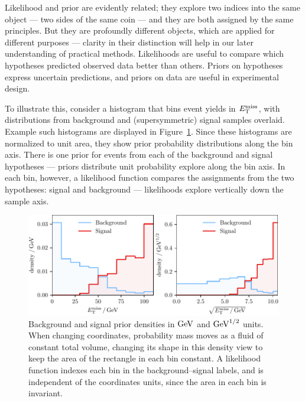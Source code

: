 Likelihood and prior are evidently related; they explore two indices into
the same object --- two sides of the same coin --- and they are both assigned
by the same principles.
But they are profoundly different objects, which are applied for different
purposes ---
clarity in their distinction will help in our later understanding of
practical methods.
Likelihoods are useful to compare which hypotheses predicted observed data
better than others.
Priors on hypotheses express uncertain predictions, and
priors on data are useful in experimental design.

To illustrate this, consider a histogram that bins event yields in
$\met$, with distributions from background and (supersymmetric) signal samples
overlaid.
Example such histograms are displayed in
Figure~\ref{fig:searches_sig_bkg_prior_likelihood}.
Since these histograms are normalized to unit area, they show prior
probability distributions along the bin axis.
There is one prior for events from each of the background and signal
hypotheses ---
priors distribute unit probability explore along the bin axis.
In each bin, however, a likelihood function compares the assignments from
the two hypotheses: signal and background ---
likelihoods explore vertically down the sample axis.

\begin{figure}[tp]
\centering
\includegraphics[width=\textwidth]{figures/searches_sig_bkg_prior_likelihood.pdf}
\caption[
Background and signal prior densities
]{%
Background and signal prior densities in $\eV[G]$ and $\eV[G]^{1/2}$ units.
When changing coordinates, probability mass moves as a fluid of constant total
volume, changing its shape in this density view to keep the area of the
rectangle in each bin constant.
A likelihood function indexes each bin in the background--signal labels,
and is independent of the coordinates units, since the area in each bin is
invariant.
}
\label{fig:searches_sig_bkg_prior_likelihood}
\end{figure}

